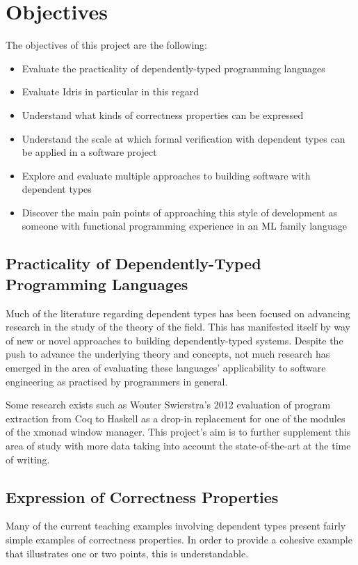 \documentclass[a4paper, notitlepage]{report}
\begin{document}
\section{Objectives \label{sec-objectives}}
\label{sec:org25ef397}
The objectives of this project are the following:
\begin{itemize}
\item Evaluate the practicality of dependently-typed programming languages
\item Evaluate Idris in particular in this regard
\item Understand what kinds of correctness properties can be expressed
\item Understand the scale at which formal verification with dependent types can be
applied in a software project
\item Explore and evaluate multiple approaches to building software with dependent
types
\item Discover the main pain points of approaching this style of development as
someone with functional programming experience in an ML family language
\end{itemize}

\subsection{Practicality of Dependently-Typed Programming Languages}
\label{sec:org6c72a84}
Much of the literature regarding dependent types has been focused on advancing
research in the study of the theory of the field. This has manifested itself by
way of new or novel approaches to building dependently-typed systems. Despite
the push to advance the underlying theory and concepts, not much research has
emerged in the area of evaluating these languages' applicability to software
engineering as practised by programmers in general.

Some research exists such as Wouter Swierstra's 2012 evaluation
\cite{swierstra_xmonad_2012} of program extraction from Coq to Haskell as a
drop-in replacement for one of the modules of the xmonad window manager. This
project's aim is to further supplement this area of study with more data taking
into account the state-of-the-art at the time of writing.

\subsection{Expression of Correctness Properties}
\label{sec:org3f35e9c}
Many of the current teaching examples involving dependent types present fairly
simple examples of correctness properties. In order to provide a cohesive
example that illustrates one or two points, this is understandable.
\end{document}
